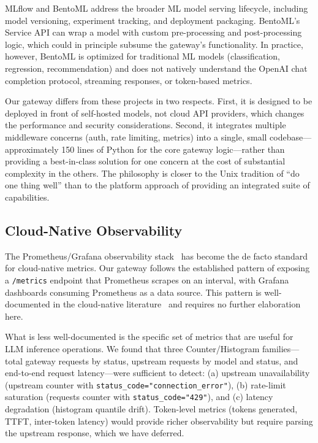 \documentclass[10pt,journal]{IEEEtran}
\begin{document}
MLflow and BentoML address the broader ML model serving lifecycle, including model versioning, experiment tracking, and deployment packaging. BentoML's Service API can wrap a model with custom pre-processing and post-processing logic, which could in principle subsume the gateway's functionality. In practice, however, BentoML is optimized for traditional ML models (classification, regression, recommendation) and does not natively understand the OpenAI chat completion protocol, streaming responses, or token-based metrics.

Our gateway differs from these projects in two respects. First, it is designed to be deployed in front of self-hosted models, not cloud API providers, which changes the performance and security considerations. Second, it integrates multiple middleware concerns (auth, rate limiting, metrics) into a single, small codebase---approximately 150 lines of Python for the core gateway logic---rather than providing a best-in-class solution for one concern at the cost of substantial complexity in the others. The philosophy is closer to the Unix tradition of ``do one thing well'' than to the platform approach of providing an integrated suite of capabilities.

\subsection{Cloud-Native Observability}

The Prometheus/Grafana observability stack~\cite{prometheus} has become the de facto standard for cloud-native metrics. Our gateway follows the established pattern of exposing a \texttt{/metrics} endpoint that Prometheus scrapes on an interval, with Grafana dashboards consuming Prometheus as a data source. This pattern is well-documented in the cloud-native literature~\cite{burns2016borg} and requires no further elaboration here.

What is less well-documented is the specific set of metrics that are useful for LLM inference operations. We found that three Counter/Histogram families---total gateway requests by status, upstream requests by model and status, and end-to-end request latency---were sufficient to detect: (a) upstream unavailability (upstream counter with \texttt{status\_code="connection\_error"}), (b) rate-limit saturation (requests counter with \texttt{status\_code="429"}), and (c) latency degradation (histogram quantile drift). Token-level metrics (tokens generated, TTFT, inter-token latency) would provide richer observability but require parsing the upstream response, which we have deferred.
\end{document}
